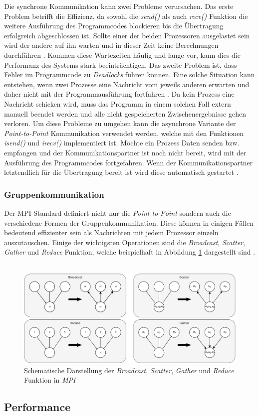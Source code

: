 Die synchrone Kommunikation kann zwei Probleme verursachen. Das erste Problem betrifft die Effizienz, da sowohl die \emph{send()} als auch \emph{recv()} Funktion die weitere Ausführung des Programmcodes blockieren bis die Übertragung erfolgreich abgeschlossen ist. Sollte einer der beiden Prozessoren ausgelastet sein wird der andere auf ihn warten und in dieser Zeit keine Berechnungen durchführen \cite{nielsen2016introduction}. Kommen diese Wartezeiten häufig und lange vor, kann dies die Performanz des Systems stark beeinträchtigen. Das zweite Problem ist, dass Fehler im Programmcode zu \emph{Deadlocks} führen können. Eine solche Situation kann entstehen, wenn zwei Prozesse eine Nachricht vom jeweils anderen erwarten und daher nicht mit der Programmausführung fortfahren \cite{nielsen2016introduction}. Da kein Prozess eine Nachricht schicken wird, muss das Programm in einem solchen Fall extern manuell beendet werden und alle nicht gespeicherten Zwischenergebnisse gehen verloren. Um diese Probleme zu umgehen kann die asynchrone Variante der \emph{Point-to-Point} Kommunikation verwendet werden, welche mit den Funktionen \emph{isend()} und \emph{irecv()} implementiert ist. Möchte ein Prozess Daten senden bzw. empfangen und der Kommunikationspartner ist noch nicht bereit, wird mit der Ausführung des Programmcodes fortgefahren. Wenn der Kommunikationspartner letztendlich für die Übertragung bereit ist wird diese automatisch gestartet \cite{nielsen2016introduction}. 

\subsubsection{Gruppenkommunikation} %
Der \ac{MPI} Standard definiert nicht nur die \emph{Point-to-Point} sondern auch die verschiedene Formen der Gruppenkommunikation. Diese können in einigen Fällen bedeutend effizienter sein als Nachrichten mit jedem Prozessor einzeln auszutauschen. Einige der wichtigsten Operationen sind die \emph{Broadcast}, \emph{Scatter}, \emph{Gather} und \emph{Reduce} Funktion, welche beispielhaft in Abbildung \ref{fig:mpi_group_communication} dargestellt sind \cite{dongarra1995introduction}.
\\\\
\begin{figure}[!h]
	\centering
	\includegraphics[width=1\textwidth]{./img/mpi_group_communication.pdf} 
	\caption{Schematische Darstellung der \emph{Broadcast}, \emph{Scatter}, \emph{Gather} und \emph{Reduce} Funktion in \emph{MPI}}
	\label{fig:mpi_group_communication}
\end{figure}



\subsection{Performance}


